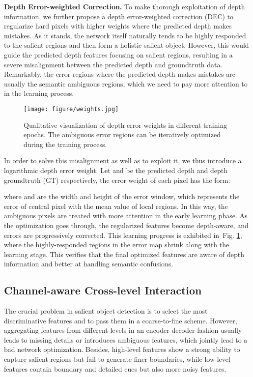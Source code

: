 \documentclass[journal]{IEEEtran}
\newcommand{\figref}[1]{Fig. \ref{#1}}
\begin{document}
\textbf{Depth Error-weighted Correction.}
To make thorough exploitation of depth information, we further propose a depth error-weighted correction (DEC) to regularize hard pixels with higher weights where the predicted depth makes mistakes. As it stands, the network itself naturally tends to be highly responded to the salient regions and then form a holistic salient object. However, this would guide the predicted depth features focusing on salient regions, resulting in a severe misalignment between the predicted depth and groundtruth data. Remarkably, the error regions where the predicted depth makes mistakes are usually the semantic ambiguous regions, which we need to pay more attention to in the learning process.

 \begin{figure}[t]
 	\begin{center}
\texttt{[image: figure/weights.jpg]}
 		\caption{Qualitative visualization of depth error weights in different training epochs. The ambiguous error regions can be iteratively optimized during the training process.
 		}\label{fig:weights}
 	\end{center}
 \end{figure}

In order to solve this misalignment as well as to exploit it, we thus introduce a logarithmic depth error weight. Let  and  be the predicted depth and  depth groundtruth (GT) respectively, the error weight  of each pixel has the form:

where  and  are the width and height of the error window, which represents the error of central pixel with the mean value of local regions.
In this way, the ambiguous pixels are treated with more attention in the early learning phase. As the optimization goes through, the regularized features become depth-aware, and errors are progressively corrected. This learning progress is exhibited in~\figref{fig:weights}, where the highly-responded regions in the error map shrink along with the learning stage. This verifies that the final optimized features are aware of depth information and better at handling semantic confusions.


\subsection{Channel-aware Cross-level Interaction} \label{sec:CAF}
The crucial problem in salient object detection is to select the most discriminative features and to pass them in a coarse-to-fine scheme. However, aggregating features from different levels in an encoder-decoder fashion usually leads to missing details or introduces ambiguous features, which jointly lead to a bad network optimization. Besides, high-level features show a strong ability to capture salient regions but fail to generate finer boundaries, while low-level features contain boundary and detailed cues but also more noisy features.
\end{document}
